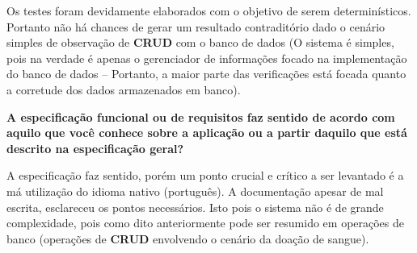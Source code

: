 \documentclass[12pt,a4paper]{report}
\begin{document}
Os testes foram devidamente elaborados com o objetivo de serem determinísticos. Portanto não há chances de gerar um resultado contraditório dado o cenário simples de observação de \textbf{CRUD} com o banco de dados (O sistema é simples, pois na verdade é apenas o gerenciador de informações focado na implementação do banco de dados -- Portanto, a maior parte das verificações está focada quanto a corretude dos dados armazenados em banco). 


\textbf{ A especificação funcional ou de requisitos faz sentido de acordo com aquilo que você conhece sobre a aplicação ou a partir daquilo que está descrito na especificação geral?
}

A especificação faz sentido, porém um ponto crucial e crítico a ser levantado é a má utilização do idioma nativo (português). A documentação apesar de mal escrita, esclareceu os pontos necessários. Isto pois o sistema não é de grande complexidade, pois como dito anteriormente pode ser resumido em operações de banco (operações de \textbf{CRUD} envolvendo o cenário da doação de sangue).
\end{document}
